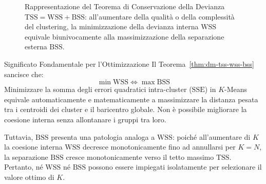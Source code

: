 \begin{figure}[H]
\centering
{}
\caption{Rappresentazione del Teorema di Conservazione della Devianza $\mathrm{TSS} = \mathrm{WSS} + \mathrm{BSS}$: all'aumentare della qualità o della complessità del clustering, la minimizzazione della devianza interna $\mathrm{WSS}$ equivale biunivocamente alla massimizzazione della separazione esterna $\mathrm{BSS}$.}
\label{fig:dm-tss-decomposition-bar}
\end{figure}

\begin{alertblock}{Significato Fondamentale per l'Ottimizzazione}
Il Teorema~\ref{thm:dm-tss-wss-bss} sancisce che:
\begin{equation}
\min \mathrm{WSS} \iff \max \mathrm{BSS}
\end{equation}
Minimizzare la somma degli errori quadratici intra-cluster ($\mathrm{SSE}$) in $K$-Means equivale automaticamente e matematicamente a massimizzare la distanza pesata tra i centroidi dei cluster e il baricentro globale. Non è possibile migliorare la coesione interna senza allontanare i gruppi tra loro.

Tuttavia, $\mathrm{BSS}$ presenta una patologia analoga a $\mathrm{WSS}$: poiché all'aumentare di $K$ la coesione interna $\mathrm{WSS}$ decresce monotonicamente fino ad annullarsi per $K=N$, la separazione $\mathrm{BSS}$ cresce monotonicamente verso il tetto massimo $\mathrm{TSS}$. Pertanto, né $\mathrm{WSS}$ né $\mathrm{BSS}$ possono essere impiegati isolatamente per selezionare il valore ottimo di $K$.
\end{alertblock}

